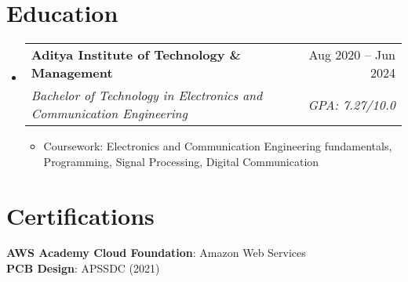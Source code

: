 \documentclass[letterpaper,9pt]{article}
\makeatletter
\newcommand{\resumeItem}[1]{
  \item\small{
    {#1 \vspace{-2pt}}
  }
}
\newcommand{\resumeSubheading}[4]{
  \vspace{-2pt}\item
    \begin{tabular*}{0.97\textwidth}[t]{l@{\extracolsep{\fill}}r}
      \textbf{#1} & #2 \\
      \textit{\small#3} & \textit{\small #4} \\
    \end{tabular*}\vspace{-7pt}
}
\newcommand{\resumeSubHeadingListStart}{\begin{itemize}[leftmargin=0.15in, label={}]}
\newcommand{\resumeSubHeadingListEnd}{\end{itemize}}
\newcommand{\resumeItemListStart}{\begin{itemize}}
\newcommand{\resumeItemListEnd}{\end{itemize}\vspace{-5pt}}
\makeatother
\begin{document}
\section{Education}
  \resumeSubHeadingListStart
    \resumeSubheading
      {Aditya Institute of Technology \& Management}{Aug 2020 -- Jun 2024}
      {Bachelor of Technology in Electronics and Communication Engineering}{GPA: 7.27/10.0}
      \resumeItemListStart
        \resumeItem{Coursework: Electronics and Communication Engineering fundamentals, Programming, Signal Processing, Digital Communication}
      \resumeItemListEnd
  \resumeSubHeadingListEnd

\section{Certifications}
 \begin{itemize}[leftmargin=0.15in, label={}]
    \small{\item{
     \textbf{AWS Academy Cloud Foundation}{: Amazon Web Services} \\
     \textbf{PCB Design}{: APSSDC (2021)} \\
    }}
 \end{itemize}
\end{document}
